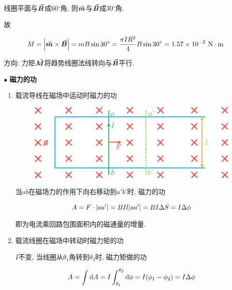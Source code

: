 \begin{example}
\begin{solution}
		线圈平面与$\va*{B}$成60$^{\circ}$角, 则$\va*{m}$与$\va*{B}$成30$^{\circ}$角. 
		
		故
		
		\begin{equation*}
			M = \abs{\va*{m} \times \va*{B}} = mB\sin 30^{\circ} = \dfrac{\pi I R^2}{4} B\sin 30^{\circ} = 1.57 \times 10^{-2} \textrm{~N} \cdot \textrm{m}
		\end{equation*}
		
		方向: 力矩$\va*{M}$将趋势线圈法线转向与$\va*{B}$平行. 
		
	\end{solution}
	
\end{example}

$\bullet$ \textbf{磁力的功}

\begin{enumerate}[itemindent=1em]
	
	\item 载流导线在磁场中运动时磁力的功
	
	\begin{figure}[H]
		\centering
		\includegraphics[scale=0.8]{C8-fig19.eps}
	\end{figure}
	
	当$ab$在磁场力的作用下向右移动到$a'b'$时, 磁力的功
	
	\begin{equation}
		A = F \cdot \abs{aa'} = BIl \abs{aa'} = BI\Delta S = I\Delta \phi \label{C8-eq19}
	\end{equation}
	
	即为电流乘回路包围面积内的磁通量的增量. 
	
	\item 载流线圈在磁场中转动时磁力矩的功
	
	$I$不变, 当线圈从$\theta_1$角转到$\theta_2$时, 磁力矩做的功
	
	\begin{equation}
		A = \int \dd{A} = I \int_{\theta_1}^{\theta_2} \dd{\phi} = I\qty(\phi_1 - \phi_2) = I \Delta \phi \label{C8-eq20}
	\end{equation}
	

\end{enumerate}
